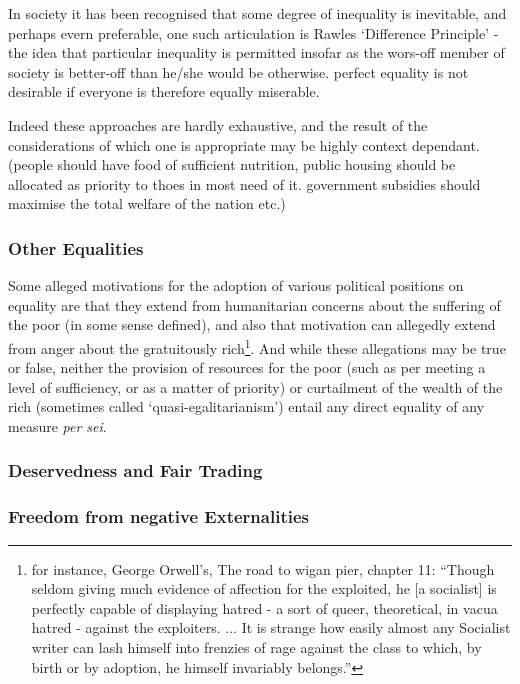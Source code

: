 In society it has been recognised that some degree of inequality is inevitable, and perhaps evern preferable, one such articulation is Rawles `Difference Principle' - the idea that particular inequality is permitted insofar as the wors-off member of society is better-off than he/she would be otherwise.
perfect equality is not desirable if everyone is therefore equally miserable.

Indeed these approaches are hardly exhaustive, and the result of the considerations of which one is appropriate may be highly context dependant. (people should have food of sufficient nutrition, public housing should be allocated as priority to thoes in most need of it. government subsidies should maximise the total welfare of the nation etc.) 



\subsubsection{Other Equalities}

Some alleged motivations for the adoption of various political positions on equality are that they extend from humanitarian concerns about the suffering of the poor (in some sense defined), and also that motivation can allegedly extend from anger about the gratuitously rich\footnote{for instance, George Orwell's, The road to wigan pier, chapter 11: ``Though seldom giving much evidence of affection for the exploited, he [a socialist] is perfectly capable of displaying hatred - a sort of queer, theoretical, in vacua hatred - against the exploiters. ... It is strange how easily almost any Socialist writer can lash himself into frenzies of rage against the class to which, by birth or by adoption, he himself invariably belongs.'' }.
And while these allegations may be true or false, neither the provision of resources for the poor (such as per meeting a level of sufficiency, or as a matter of priority) or curtailment of the wealth of the rich (sometimes called `quasi-egalitarianism') entail any direct equality of any measure \textit{per sei}.


\subsubsection{Deservedness and Fair Trading}



\subsubsection{Freedom from negative Externalities}

